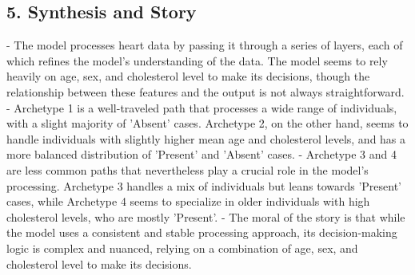 \subsection*{5. Synthesis and Story}
- The model processes heart data by passing it through a series of layers, each of which refines the model's understanding of the data. The model seems to rely heavily on age, sex, and cholesterol level to make its decisions, though the relationship between these features and the output is not always straightforward.
- Archetype 1 is a well-traveled path that processes a wide range of individuals, with a slight majority of 'Absent' cases. Archetype 2, on the other hand, seems to handle individuals with slightly higher mean age and cholesterol levels, and has a more balanced distribution of 'Present' and 'Absent' cases.
- Archetype 3 and 4 are less common paths that nevertheless play a crucial role in the model's processing. Archetype 3 handles a mix of individuals but leans towards 'Present' cases, while Archetype 4 seems to specialize in older individuals with high cholesterol levels, who are mostly 'Present'.
- The moral of the story is that while the model uses a consistent and stable processing approach, its decision-making logic is complex and nuanced, relying on a combination of age, sex, and cholesterol level to make its decisions.
